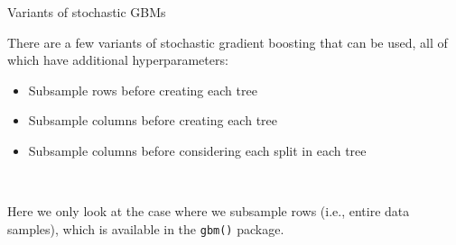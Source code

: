 \documentclass[
  10pt,
  ignorenonframetext,
]{beamer}
\providecommand{\tightlist}{%
  \setlength{\itemsep}{0pt}\setlength{\parskip}{0pt}}
\begin{document}
\begin{frame}[fragile]
\begin{block}{Variants of stochastic GBMs}
\protect\hypertarget{variants-of-stochastic-gbms}{}
\(~\)

There are a few variants of stochastic gradient boosting that can be
used, all of which have additional hyperparameters:

\vspace{2mm}

\begin{itemize}
\tightlist
\item
  Subsample rows before creating each tree
\end{itemize}

\vspace{2mm}

\begin{itemize}
\tightlist
\item
  Subsample columns before creating each tree
\end{itemize}

\vspace{2mm}

\begin{itemize}
\tightlist
\item
  Subsample columns before considering each split in each tree
\end{itemize}

\(~\)

Here we only look at the case where we subsample rows (i.e., entire data
samples), which is available in the \texttt{gbm()} package.
\end{block}
\end{frame}
\end{document}
